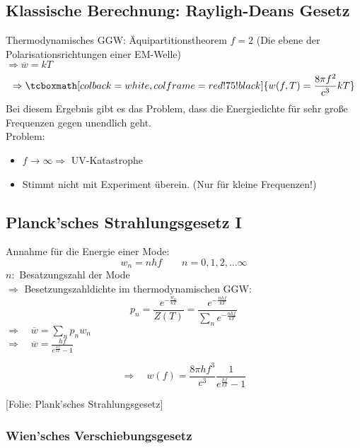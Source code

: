 \documentclass[titlepage,11pt,a4paper,ngerman]{report}
\newcommand{\ol}[1]{\overline{#1}}
\newcommand{\folie}[1]{\color{gray}[Folie: #1]\color{black}}
\newcommand{\lcom}[1]{\color{MidnightBlue}#1\color{black}}
\newcommand{\frbox}[2]{\begin{tcolorbox}[colback=white,colframe=red!75!black,fonttitle=\bfseries,title=#1]#2\end{tcolorbox}}
\newcommand{\rmbox}[1]{\tcboxmath[colback=white,colframe=red!75!black]{#1}}
\begin{document}
\subsection{Klassische Berechnung: Rayligh-Deans Gesetz}

Thermodynamisches GGW: Äquipartitionstheorem $ f = 2 $ (Die ebene der Polarisationsrichtungen einer EM-Welle)\\[5pt]
$ \Rightarrow \ol{w} = k T $
\begin{equation*}
\Rightarrow \rmbox{w(f,T) = \frac{8 \pi f^2}{c^3} k T}
\end{equation*}
\lcom{Bei diesem Ergebnis gibt es das Problem, dass die Energiedichte für sehr große Frequenzen gegen unendlich geht. \lightning}\\
Problem:
\begin{itemize}
	\item $ f \to \infty \Rightarrow $ UV-Katastrophe
	\item Stimmt nicht mit Experiment überein. (Nur für kleine Frequenzen!)
\end{itemize}

\subsection{Planck'sches Strahlungsgesetz I}

Annahme für die Energie einer Mode:
\begin{equation*}
w_n = n h f \qquad n = 0,1,2, \dots \infty
\end{equation*}
$ n : $ Besatzungszahl der Mode\\[5pt]
$ \Rightarrow $ Besetzungszahldichte im thermodynamischen GGW:
\begin{equation*}
p_n = \frac{e^{-\frac{w_n}{kT}}}{Z(T)} = \frac{e^{-\frac{n h f}{k T}}}{\sum_n e^{-\frac{nhf}{kT}}}
\end{equation*}
$ \Rightarrow \quad \ol{w} = \sum_n p_n w_n $\\[5pt]
$ \Rightarrow \quad \ol{w} = \frac{hf}{e^{\frac{hf}{kT}} - 1} $
\frbox{Plank'sches Strahlungsgesetz}{
\begin{equation*}
\Rightarrow \quad w(f) = \frac{8 \pi h f^3}{c^3} \frac{1}{e^{\frac{hf}{kT}} - 1}
\end{equation*}}
\noindent
\folie{Plank'sches Strahlungsgesetz}

\subsubsection{Wien'sches Verschiebungsgesetz}
\end{document}
